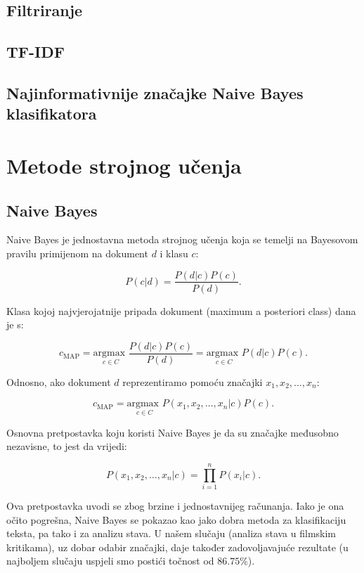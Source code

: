 \documentclass[conference]{IEEEtran}
\begin{document}
\subsection{Filtriranje}

\subsection{TF-IDF}

\subsection{Najinformativnije značajke Naive Bayes klasifikatora}

\section{Metode strojnog učenja}

\subsection{Naive Bayes}

Naive Bayes je jednostavna metoda strojnog učenja koja se temelji na Bayesovom pravilu primijenom na dokument $d$ i klasu $c$:

\[P(c|d) = \frac{P(d|c)P(c)}{P(d)}.\]

Klasa kojoj najvjerojatnije pripada dokument (maximum a posteriori class) dana je s:

\[c_{\text{MAP}} = \underset{{c \in C}}{\text{argmax }} \frac{P(d|c)P(c)}{P(d)}
= \underset{{c \in C}}{\text{argmax }} P(d|c)P(c).\] 

Odnosno, ako dokument $d$ reprezentiramo pomoću značajki $x_1, x_2, \ldots, x_n$:

\[c_{\text{MAP}} = \underset{{c \in C}}{\text{argmax }} P(x_1, x_2, \ldots, x_n|c)P(c).\]

Osnovna pretpostavka koju koristi Naive Bayes je da su značajke međusobno nezavisne, to jest da vrijedi:

\[P(x_1, x_2, \ldots, x_n|c) = \prod_{i=1}^n P(x_i|c).\]

Ova pretpostavka uvodi se zbog brzine i jednostavnijeg računanja. Iako je ona očito pogrešna, Naive Bayes se pokazao kao jako dobra metoda za klasifikaciju teksta, pa tako i za analizu stava. U našem slučaju (analiza stava u filmskim kritikama), uz dobar odabir značajki, daje također zadovoljavajuće rezultate (u najboljem slučaju uspjeli smo postići točnost od $86.75\%$).
\end{document}
